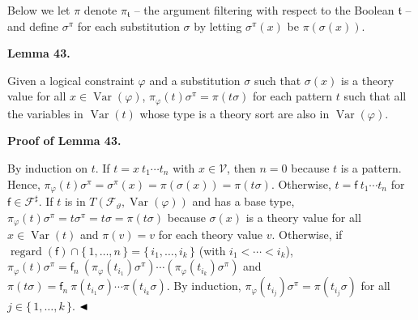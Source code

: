  
 
Below we let $\pi$ denote $\pi_{\mathfrak{t}}$ – the argument filtering with respect to the Boolean $\mathfrak{t}$ – and define $\sigma^{\pi}$ for each substitution $\sigma$ by letting $\sigma^{\pi}(x)$ be $\pi(\sigma(x))$.\par
 
 
 
\par\medskip\noindent\textbf{Lemma 43.}\par
 
 
Given a logical constraint $\varphi$ and a substitution $\sigma$ such that $\sigma(x)$ is a theory value for all $x\in\operatorname{Var}(\varphi)$, $\pi_{\varphi}(t)\sigma^{\pi}=\pi(t\sigma)$ for each pattern $t$ such that all the variables in $\operatorname{Var}(t)$ whose type is a theory sort are also in $\operatorname{Var}(\varphi)$.\par
 
 
 
 
 
\par\medskip\noindent\textbf{Proof of Lemma 43.}\par
 
 
By induction on $t$. If $t={x}\ {{t}_{1}\cdots{t}_{n}}$ with $x\in\mathcal{V}$, then $n=0$ because $t$ is a pattern. Hence, $\pi_{\varphi}(t)\sigma^{\pi}=\sigma^{\pi}(x)=\pi(\sigma(x))=\pi(t\sigma)$. Otherwise, $t={\mathsf{f}}\ {{t}_{1}\cdots{t}_{n}}$ for $\mathsf{f}\in\mathcal{F}^{\sharp}$. If $t$ is in $T({\mathcal{F}}_{\vartheta},\operatorname{Var}(\varphi))$ and has a base type, $\pi_{\varphi}(t)\sigma^{\pi}=t\sigma^{\pi}=t\sigma=\pi(t\sigma)$ because $\sigma(x)$ is a theory value for all $x\in\operatorname{Var}(t)$ and $\pi(v)=v$ for each theory value $v$. Otherwise, if $\operatorname{regard}(\mathsf{f})\cap\{\,1,\ldots,n\,\}=\{\,{i}_{1},\ldots,{i}_{k}\,\}$ (with ${i}_{1}<\cdots<{i}_{k}$), $\pi_{\varphi}(t)\sigma^{\pi}={\mathsf{f}_{n}}\ {(\pi_{\varphi}(t_{i_{1}})\sigma^{\pi})\cdots(\pi_{\varphi}(t_{i_{k}})\sigma^{\pi})}$ and $\pi(t\sigma)={\mathsf{f}_{n}}\ {\pi(t_{i_{1}}\sigma)\cdots\pi(t_{i_{k}}\sigma)}$. By induction, $\pi_{\varphi}(t_{i_{j}})\sigma^{\pi}=\pi(t_{i_{j}}\sigma)$ for all $j\in\{\,1,\ldots,k\,\}$. $\hfill\blacktriangleleft$\par
 
